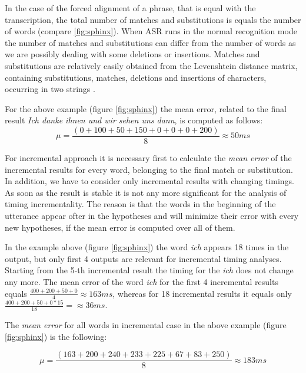 In the case of the forced alignment of a phrase, that is equal with the
transcription, the total number of matches and substitutions is equals the
number of words (compare \ref{fig:sphinx}). When ASR runs in the normal
recognition mode the number of matches and substitutions can differ from the number of words as we are possibly  dealing with some deletions or insertions. Matches and
substitutions are relatively easily obtained from the 
Levenshtein distance matrix, containing substitutions, matches, deletions and
insertions of characters, occurring in two strings \parencite {levenshtein1966}.  

For the above example (figure \ref{fig:sphinx}) the mean  error, related to
the final result \textit {Ich danke ihnen und wir sehen uns dann}, is computed
as follows:
\begin{equation} \mu=\frac{(0+100+50+150+0+0+0+200)}{8} \approx 50 ms
\label{eq:mean_comp}
\end{equation}

For incremental approach it is necessary first to calculate the \textit {
 mean error} of the incremental results for every word, belonging to the final match or
substitution. In addition, we have to consider only incremental results with
changing timings. As soon as the result is stable it is not any more significant
for the analysis of timing incrementality. The reason is that the words in the
beginning of the utterance appear ofter in the hypotheses and will minimize their error with
every new hypotheses, if the mean error is computed over all of them.  

In the example above (figure \ref{fig:sphinx}) the word \textit  {ich} 
appears 18 times in the output, but only first 4 outputs are relevant for incremental timing
analyses.  Starting from the 5-th incremental result the timing for the \textit
{ich} does not change any more.  The mean error of the word \textit {ich} for
the first 4 incremental results equals $\frac {400+200+50+0}{4}\approx 163 ms$, whereas for 18 incremental results 
it equals only $\frac {400+200+50+0*15}{18}=\approx 36 ms$. 

The \textit {mean error} for all words in incremental case in the above example
(figure \ref{fig:sphinx}) is the following:

\begin{equation} \mu=\frac{(163 +200 +240 +233 +225+67+83+250)}{8} \approx 183 ms
\label{eq:mean_comp_inc}
\end{equation}


